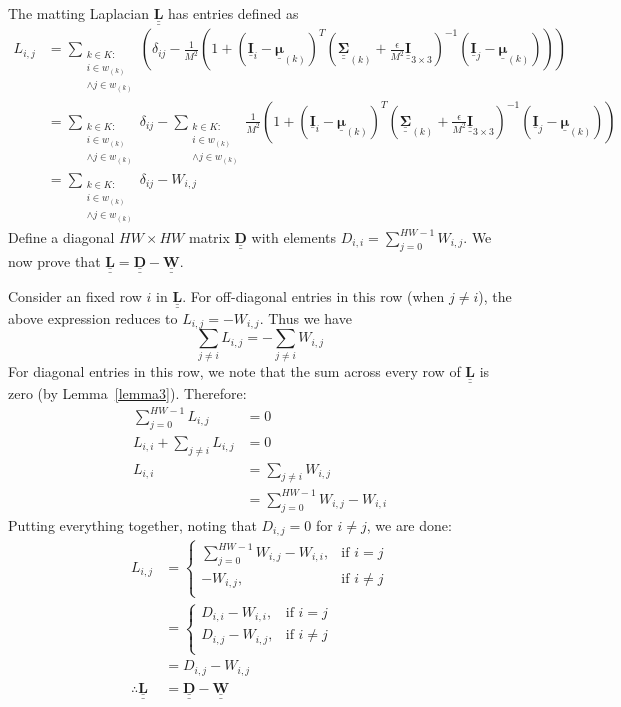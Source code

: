 \documentclass{article}
\def\vt#1{\underline{\mathbf{#1}}}
\def\vts#1{\underline{\boldsymbol{#1}}}
\def\mt#1{\underline{\underline{\mathbf{#1}}}}
\def\mts#1{\underline{\underline{\boldsymbol{#1}}}}
\begin{document}
The matting Laplacian $\mt L$ has entries defined as
\begin{align*}
    L_{i,j} &= \sum_{\substack{k\in K:\\i\in w_{(k)}\\ \wedge j\in w_{(k)}}} \left( \delta_{ij} - \frac1{M^2}\left(1 + \left(\vt{I}_i - \vts \mu_{(k)}\right)^T \left(\mts \Sigma_{(k)} + \frac\epsilon{M^2} \mt{I}_{3\times 3}\right)^{-1} \left(\vt{I}_j - \vts
\mu_{(k)}\right) \right) \right) \\
    &= \sum_{\substack{k\in K:\\i\in w_{(k)}\\ \wedge j\in w_{(k)}}} \delta_{ij} - \sum_{\substack{k\in K:\\i\in w_{(k)} \\\wedge j\in w_{(k)}}} \frac1{M^2} \left(1 + \left(\vt{I}_i - \vts \mu_{(k)}\right)^T \left(\mts \Sigma_{(k)} + \frac\epsilon{M^2} \mt{I}_{3\times 3}\right)^{-1} \left(\vt{I}_j - \vts
    \mu_{(k)}\right) \right) \\
    &= \sum_{\substack{k\in K:\\i\in w_{(k)} \\\wedge j\in w_{(k)}}} \delta_{ij} -  W_{i,j}
\end{align*}
Define a diagonal $HW\times HW$ matrix $\mt D$ with elements $D_{i,i} = \sum_{j=0}^{HW-1} W_{i,j}$. We now prove that $\mt L = \mt D - \mt W$.

Consider an fixed row $i$ in $\mt L$. For off-diagonal entries in this row (when $j\neq i$), the above expression reduces to $L_{i,j} = -W_{i,j}$. Thus we have
$$\sum_{j\neq i} L_{i,j} = -\sum_{j\neq i} W_{i,j}$$
For diagonal entries in this row, we note that the sum across every row of $\mt L$ is zero (by Lemma~\ref{lemma3}). Therefore:
\begin{align*}
    \sum_{j=0}^{HW-1} L_{i,j} &= 0\\
    L_{i,i} + \sum_{j\neq i} L_{i,j} &= 0\\
    L_{i,i} &= \sum_{j\neq i} W_{i,j}\\
    &= \sum_{j=0}^{HW-1} W_{i,j} - W_{i,i}
\end{align*}
Putting everything together, noting that $D_{i,j}=0$ for $i\neq j$, we are done:
\begin{align*}
    L_{i,j} &= \begin{cases}
        \sum_{j=0}^{HW-1} W_{i,j} - W_{i,i},&\text{if $i=j$}\\
        - W_{i,j},&\text{if $i\neq j$}\\
    \end{cases} \\
    &= \begin{cases}
        D_{i,i} - W_{i,i},&\text{if $i=j$}\\
        D_{i,j} - W_{i,j},&\text{if $i\neq j$}\\
    \end{cases}\\
    &= D_{i,j} - W_{i,j}\\
    \therefore \mt L &= \mt D - \mt W
\end{align*}
\end{document}
